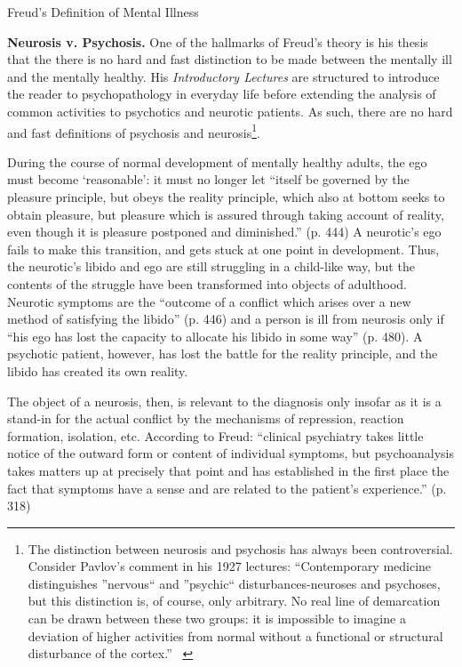 \begin{refsection}
\begin{apatextbox}{Freud's Definition of Mental Illness}
\label{def:freud}\end{apatextbox}

\textbf{Neurosis v. Psychosis.} One of the hallmarks of Freud's theory is his thesis that the there is no hard and fast distinction to be made between the mentally ill and the mentally healthy. His \emph{Introductory Lectures} are structured to introduce the reader to psychopathology in everyday life before extending the analysis of common activities to psychotics and neurotic patients. As such, there are no hard and fast definitions of psychosis and neurosis\footnote{The distinction between neurosis and psychosis has always been controversial. Consider Pavlov's comment in his 1927 lectures: ``Contemporary medicine distinguishes ''nervous`` and ''psychic`` disturbances-neuroses and psychoses, but this distinction is, of course, only arbitrary. No real line of demarcation can be drawn between these two groups: it is impossible to imagine a deviation of higher activities from normal without a functional or structural disturbance of the cortex.'' ~\citep[Lecture 23]{Pavlov:1946ws}}.

During the course of normal development of mentally healthy adults, the ego must become `reasonable': it must no longer let ``itself be governed by the pleasure principle, but obeys the reality principle, which also at bottom seeks to obtain pleasure, but pleasure which is assured through taking account of reality, even though it is pleasure postponed and diminished.'' (p. 444) A neurotic's ego fails to make this transition, and gets stuck at one point in development. Thus, the neurotic's libido and ego are still struggling in a child-like way, but the contents of the struggle have been transformed into objects of adulthood. Neurotic symptoms are the ``outcome of a conflict which arises over a new method of satisfying the libido'' (p. 446) and a person is ill from neurosis only if ``his ego has lost the capacity to allocate his libido in some way'' (p. 480). A psychotic patient, however, has lost the battle for the reality principle, and the libido has created its own reality.

The object of a neurosis, then, is relevant to the diagnosis only insofar as it is a stand-in for the actual conflict by the mechanisms of repression, reaction formation, isolation, etc. According to Freud: ``clinical psychiatry takes little notice of the outward form or content of individual symptoms, but psychoanalysis takes matters up at precisely that point and has established in the first place the fact that symptoms have a sense and are related to the patient's experience.'' (p. 318)


\end{refsection}
